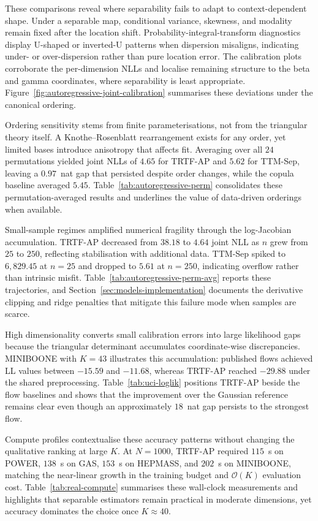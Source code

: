 \documentclass[11pt,a4paper,twoside]{book}\usepackage[]{graphicx}\usepackage[]{xcolor}
\begin{document}
These comparisons reveal where separability fails to adapt to context-dependent shape. Under a separable map, conditional variance, skewness, and modality remain fixed after the location shift. Probability-integral-transform diagnostics display U-shaped or inverted-U patterns when dispersion misaligns, indicating under- or over-dispersion rather than pure location error. The calibration plots corroborate the per-dimension NLLs and localise remaining structure to the beta and gamma coordinates, where separability is least appropriate. Figure~\ref{fig:autoregressive-joint-calibration} summarises these deviations under the canonical ordering.

Ordering sensitivity stems from finite parameterisations, not from the triangular theory itself. A Knothe--Rosenblatt rearrangement exists for any order, yet limited bases introduce anisotropy that affects fit. Averaging over all $24$ permutations yielded joint NLLs of $4.65$ for TRTF-AP and $5.62$ for TTM-Sep, leaving a $0.97$~nat gap that persisted despite order changes, while the copula baseline averaged $5.45$. Table~\ref{tab:autoregressive-perm} consolidates these permutation-averaged results and underlines the value of data-driven orderings when available.

Small-sample regimes amplified numerical fragility through the log-Jacobian accumulation. TRTF-AP decreased from $38.18$ to $4.64$ joint NLL as $n$ grew from $25$ to $250$, reflecting stabilisation with additional data. TTM-Sep spiked to $6{,}829.45$ at $n=25$ and dropped to $5.61$ at $n=250$, indicating overflow rather than intrinsic misfit. Table~\ref{tab:autoregressive-perm-avg} reports these trajectories, and Section~\ref{sec:models-implementation} documents the derivative clipping and ridge penalties that mitigate this failure mode when samples are scarce.

High dimensionality converts small calibration errors into large likelihood gaps because the triangular determinant accumulates coordinate-wise discrepancies. MINIBOONE with $K=43$ illustrates this accumulation: published flows achieved LL values between $-15.59$ and $-11.68$, whereas TRTF-AP reached $-29.88$ under the shared preprocessing. Table~\ref{tab:uci-loglik} positions TRTF-AP beside the flow baselines and shows that the improvement over the Gaussian reference remains clear even though an approximately $18$~nat gap persists to the strongest flow.

Compute profiles contextualise these accuracy patterns without changing the qualitative ranking at large $K$. At $N=1000$, TRTF-AP required $115$~s on POWER, $138$~s on GAS, $153$~s on HEPMASS, and $202$~s on MINIBOONE, matching the near-linear growth in the training budget and $\mathcal{O}(K)$ evaluation cost. Table~\ref{tab:real-compute} summarises these wall-clock measurements and highlights that separable estimators remain practical in moderate dimensions, yet accuracy dominates the choice once $K \approx 40$.
\end{document}
